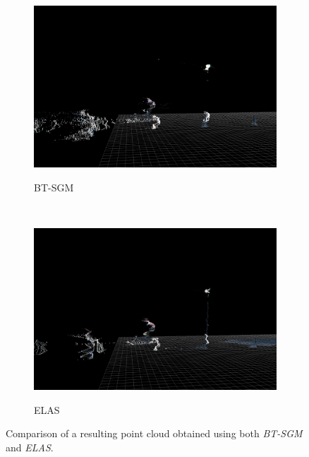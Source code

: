 \begin{figure}[th]
        \centering
        \begin{subfigure}[b]{0.475\textwidth}
                \centering
                \caption{BT-SGM}
                \includegraphics[width=\textwidth]{btsgm}\label{fig:cp05_bt_sgm}
        \end{subfigure}%
        ~ 
        \begin{subfigure}[b]{0.475\textwidth}
                \centering
                \caption{ELAS}
                \includegraphics[width=\textwidth]{elas}\label{fig:cp05_elas}                
        \end{subfigure}%
        \caption{Comparison of a resulting point cloud obtained using both \emph{BT-SGM} and \emph{ELAS}.}\label{fig:cp05_comparison_bt_sgm_vs_elas}
\end{figure}

